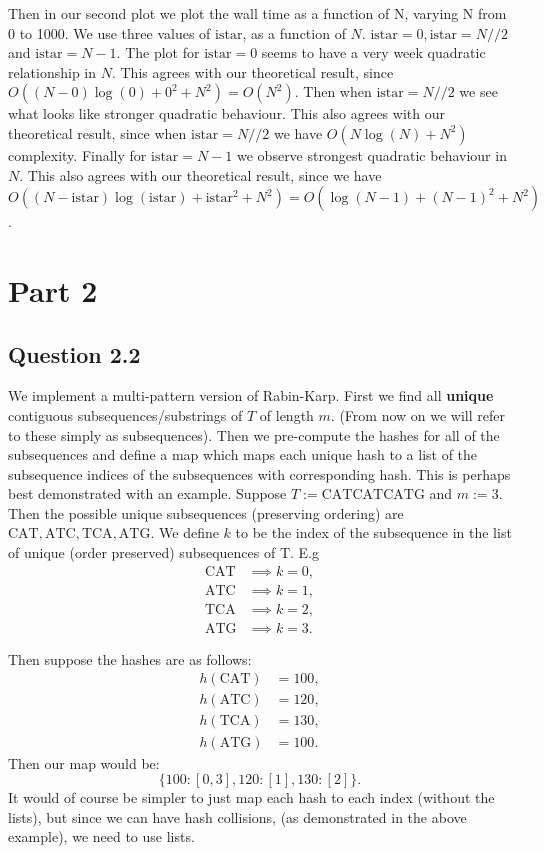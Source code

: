 \documentclass[a4paper, oneside]{book}
\begin{document}
Then in our second plot we plot the wall time as a function of N, varying N from 0 to 1000.
We use three values of $\text{istar}$, as a function of $N$. $\text{istar} = 0, \text{istar} = N // 2$ and $\text{istar} = N - 1$.
The plot for $\text{istar}=0$ seems to have a very week quadratic relationship in $N$.
This agrees with our theoretical result, since $O((N - 0)\log(0) + 0^2 + N^2) = O(N^2).$
Then when $\text{istar} = N // 2$ we see what looks like stronger quadratic behaviour.
This also agrees with our theoretical result, since when $\text{istar} = N//2$ we have $O(N\log(N) + N^2)$ complexity.
Finally for $\text{istar} = N -1$ we observe strongest quadratic behaviour in $N$. This also agrees with our theoretical
result, since we have $O((N - \text{istar})\log(\text{istar}) + \text{istar}^2 + N^2) = O(\log(N - 1) + (N - 1)^2 + N^2)$.

\section*{Part 2}

\subsection*{Question 2.2}
We implement a multi-pattern version of Rabin-Karp.
First we find all \textbf{unique} contiguous subsequences/substrings of $T$ of length $m$.
(From now on we will refer to these simply as subsequences).
Then we pre-compute the hashes for all of the subsequences
and define a map which maps each unique hash to a list of the subsequence indices
of the subsequences with corresponding hash. This is perhaps best demonstrated with an example.
Suppose $T := \text{CATCATCATG}$ and  $m := 3$. Then the possible unique subsequences (preserving ordering)
are  $\text{CAT}, \text{ATC}, \text{TCA}, \text{ATG}$. We define $k$ to be the index 
of the subsequence in the list of unique (order preserved) subsequences of T.
E.g  
\begin{align*}
    \text{CAT} &\implies k = 0, \\
    \text{ATC} &\implies k = 1,\\
    \text{TCA} &\implies k = 2,\\
    \text{ATG} &\implies k = 3.
\end{align*}

Then suppose the hashes are as follows:
\begin{align*}
    h(\text{CAT}) &= 100, \\
    h(\text{ATC}) &= 120,\\
    h(\text{TCA}) &= 130,\\
    h(\text{ATG})&= 100.
\end{align*}
Then our map would be:
\[
    \{100: [0, 3], 120: [1], 130: [2]\}
.\]
It would of course be simpler to just map each hash to each index (without the lists),
but since we can have hash collisions, (as demonstrated in the above example), we need
to use lists.
\end{document}
